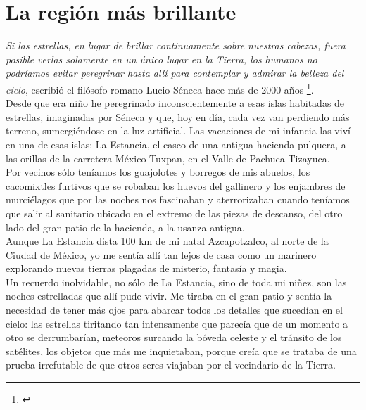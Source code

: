 \documentclass[letterpaper,11pt,twoside]{book}
\newcommand\blankpage{%
    \null
    \thispagestyle{empty}%
    \addtocounter{page}{-1}%
    \newpage}
\begin{document}
	
	\afterpage{\blankpage}	
	\let\cleardoublepage\clearpage
		
	\chapter*{La región más brillante}
	\BgThispage
	\textit{Si las estrellas, en lugar de brillar continuamente sobre nuestras cabezas, fuera posible verlas solamente en un único lugar en la Tierra, los humanos no podríamos evitar peregrinar hasta allí para contemplar y admirar la belleza del cielo}, escribió el filósofo romano Lucio Séneca hace más de 2000 años \footnote{\cite{Ribas2015}}.\\
	
	Desde que era niño he peregrinado inconscientemente a esas islas habitadas de estrellas, imaginadas por Séneca y que, hoy en día, cada vez van perdiendo más terreno, sumergiéndose en la luz artificial. Las vacaciones de mi infancia las viví en una de esas islas: La Estancia, el casco de una antigua hacienda pulquera, a las orillas de la carretera México-Tuxpan, en el Valle de Pachuca-Tizayuca.\\
	
	Por vecinos sólo teníamos los guajolotes y borregos de mis abuelos, los cacomixtles furtivos que se robaban los huevos del gallinero y los enjambres de murciélagos que por las noches nos fascinaban y aterrorizaban cuando teníamos que salir al sanitario ubicado en el extremo de las piezas de descanso, del otro lado del gran patio de la hacienda, a la usanza antigua.\\ 
	
	Aunque La Estancia dista 100 km de mi natal Azcapotzalco, al norte de la Ciudad de México, yo me sentía allí tan lejos de casa como un marinero explorando nuevas tierras plagadas de misterio, fantasía y magia.\\ 
	
	Un recuerdo inolvidable, no sólo de La Estancia, sino de toda mi niñez, son las noches estrelladas que allí pude vivir. Me tiraba en el gran patio y sentía la necesidad de tener más ojos para abarcar todos los detalles que sucedían en el cielo: las estrellas tiritando tan intensamente que parecía que de un momento a otro se derrumbarían, meteoros surcando la bóveda celeste y el tránsito de los satélites, los objetos que más me inquietaban, porque creía que se trataba de una prueba irrefutable de que otros seres viajaban por el vecindario de la Tierra.\\ 
	
\end{document}
